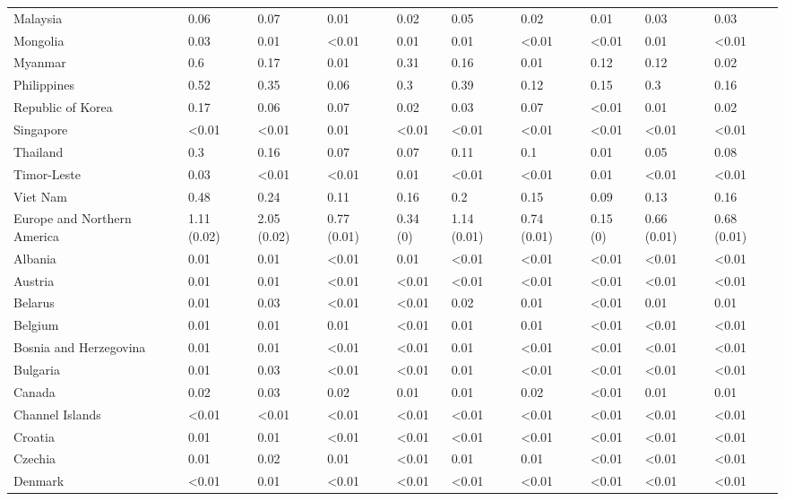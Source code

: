 \begin{longtable}[t]{llllllllll}
Malaysia & 0.06 & 0.07 & 0.01 & 0.02 & 0.05 & 0.02 & 0.01 & 0.03 & 0.03\\
\addlinespace
Mongolia & 0.03 & 0.01 & <0.01 & 0.01 & 0.01 & <0.01 & <0.01 & 0.01 & <0.01\\
Myanmar & 0.6 & 0.17 & 0.01 & 0.31 & 0.16 & 0.01 & 0.12 & 0.12 & 0.02\\
Philippines & 0.52 & 0.35 & 0.06 & 0.3 & 0.39 & 0.12 & 0.15 & 0.3 & 0.16\\
Republic of Korea & 0.17 & 0.06 & 0.07 & 0.02 & 0.03 & 0.07 & <0.01 & 0.01 & 0.02\\
Singapore & <0.01 & <0.01 & 0.01 & <0.01 & <0.01 & <0.01 & <0.01 & <0.01 & <0.01\\
\addlinespace
Thailand & 0.3 & 0.16 & 0.07 & 0.07 & 0.11 & 0.1 & 0.01 & 0.05 & 0.08\\
Timor-Leste & 0.03 & <0.01 & <0.01 & 0.01 & <0.01 & <0.01 & 0.01 & <0.01 & <0.01\\
Viet Nam & 0.48 & 0.24 & 0.11 & 0.16 & 0.2 & 0.15 & 0.09 & 0.13 & 0.16\\
Europe and Northern America & 1.11 (0.02) & 2.05 (0.02) & 0.77 (0.01) & 0.34 (0) & 1.14 (0.01) & 0.74 (0.01) & 0.15 (0) & 0.66 (0.01) & 0.68 (0.01)\\
Albania & 0.01 & 0.01 & <0.01 & 0.01 & <0.01 & <0.01 & <0.01 & <0.01 & <0.01\\
\addlinespace
Austria & 0.01 & 0.01 & <0.01 & <0.01 & <0.01 & <0.01 & <0.01 & <0.01 & <0.01\\
Belarus & 0.01 & 0.03 & <0.01 & <0.01 & 0.02 & 0.01 & <0.01 & 0.01 & 0.01\\
Belgium & 0.01 & 0.01 & 0.01 & <0.01 & 0.01 & 0.01 & <0.01 & <0.01 & <0.01\\
Bosnia and Herzegovina & 0.01 & 0.01 & <0.01 & <0.01 & 0.01 & <0.01 & <0.01 & <0.01 & <0.01\\
Bulgaria & 0.01 & 0.03 & <0.01 & <0.01 & 0.01 & <0.01 & <0.01 & <0.01 & <0.01\\
\addlinespace
Canada & 0.02 & 0.03 & 0.02 & 0.01 & 0.01 & 0.02 & <0.01 & 0.01 & 0.01\\
Channel Islands & <0.01 & <0.01 & <0.01 & <0.01 & <0.01 & <0.01 & <0.01 & <0.01 & <0.01\\
Croatia & 0.01 & 0.01 & <0.01 & <0.01 & <0.01 & <0.01 & <0.01 & <0.01 & <0.01\\
Czechia & 0.01 & 0.02 & 0.01 & <0.01 & 0.01 & 0.01 & <0.01 & <0.01 & <0.01\\
Denmark & <0.01 & 0.01 & <0.01 & <0.01 & <0.01 & <0.01 & <0.01 & <0.01 & <0.01\\

\end{longtable}
